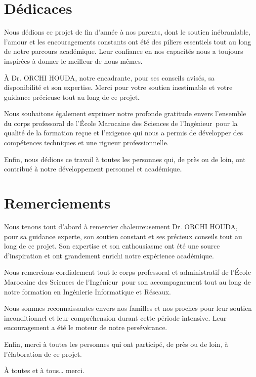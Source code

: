 \documentclass[11pt,a4paper,oneside]{report}
\newcommand{\encadrante}{Dr. ORCHI HOUDA}
\newcommand{\ecole}{École Marocaine des Sciences de l'Ingénieur}
\newcommand{\filiere}{Ingénierie Informatique et Réseaux}
\begin{document}
\chapter*{Dédicaces}

Nous dédions ce projet de fin d'année à nos parents, dont le soutien inébranlable, l'amour et les encouragements constants ont été des piliers essentiels tout au long de notre parcours académique. Leur confiance en nos capacités nous a toujours inspirées à donner le meilleur de nous-mêmes.

À \encadrante, notre encadrante, pour ses conseils avisés, sa disponibilité et son expertise. Merci pour votre soutien inestimable et votre guidance précieuse tout au long de ce projet.

Nous souhaitons également exprimer notre profonde gratitude envers l'ensemble du corps professoral de l'\ecole\ pour la qualité de la formation reçue et l'exigence qui nous a permis de développer des compétences techniques et une rigueur professionnelle.

Enfin, nous dédions ce travail à toutes les personnes qui, de près ou de loin, ont contribué à notre développement personnel et académique.

\chapter*{Remerciements}

Nous tenons tout d'abord à remercier chaleureusement \encadrante, pour sa guidance experte, son soutien constant et ses précieux conseils tout au long de ce projet. Son expertise et son enthousiasme ont été une source d'inspiration et ont grandement enrichi notre expérience académique.

Nous remercions cordialement tout le corps professoral et administratif de l'\ecole\ pour son accompagnement tout au long de notre formation en \filiere.

Nous sommes reconnaissantes envers nos familles et nos proches pour leur soutien inconditionnel et leur compréhension durant cette période intensive. Leur encouragement a été le moteur de notre persévérance.

Enfin, merci à toutes les personnes qui ont participé, de près ou de loin, à l'élaboration de ce projet.

\vspace{1cm}
\begin{flushright}
    À toutes et à tous… merci.
\end{flushright}
\end{document}
